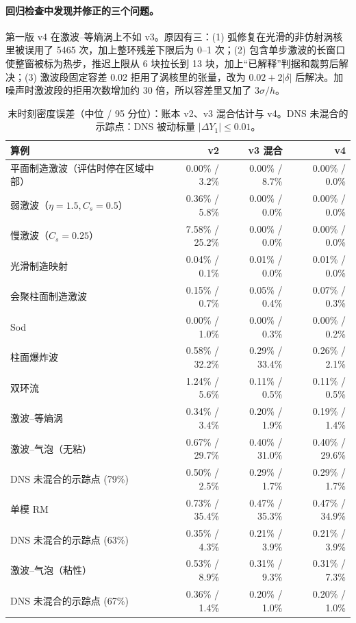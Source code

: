 \paragraph{回归检查中发现并修正的三个问题。}第一版 v4 在激波–等熵涡上不如 v3。原因有三：(1) 弧修复在光滑的非仿射涡核里被误用了 5465 次，加上整环残差下限后为 0–1 次；(2) 包含单步激波的长窗口使整窗被标为热步，推迟上限从 6 块拉长到 13 块，加上“已解释”判据和裁剪后解决；(3) 激波段固定容差 0.02 拒用了涡核里的张量，改为 $0.02+2|\delta|$ 后解决。加噪声时激波段的拒用次数增加约 30 倍，所以容差里又加了 $3\hat\sigma/h$。
\begin{table}[!htbp]\centering\small\caption{末时刻密度误差（中位 / 95 分位）：账本 v2、v3 混合估计与 v4。DNS 未混合的示踪点：DNS 被动标量 $|\Delta Y_1|\le0.01$。}
\begin{tabularx}{\linewidth}{@{}L r r r@{}}\toprule
算例 & v2 & v3 混合 & v4\\\midrule
平面制造激波（评估时停在区域中部） & 0.00\% / 3.2\% & 0.00\% / 8.7\% & 0.00\% / 0.0\%\\
弱激波（$\eta=1.5,C_s=0.5$） & 0.36\% / 5.8\% & 0.00\% / 0.0\% & 0.00\% / 0.0\%\\
慢激波（$C_s=0.25$） & 7.58\% / 25.2\% & 0.00\% / 0.0\% & 0.00\% / 0.0\%\\
光滑制造映射 & 0.04\% / 0.1\% & 0.01\% / 0.0\% & 0.01\% / 0.0\%\\
会聚柱面制造激波 & 0.15\% / 0.7\% & 0.05\% / 0.4\% & 0.07\% / 0.3\%\\
Sod & 0.00\% / 1.0\% & 0.00\% / 0.3\% & 0.00\% / 0.2\%\\
柱面爆炸波 & 0.58\% / 32.2\% & 0.29\% / 33.4\% & 0.26\% / 2.1\%\\
双环流 & 1.24\% / 5.6\% & 0.11\% / 0.5\% & 0.11\% / 0.5\%\\
激波–等熵涡 & 0.34\% / 3.4\% & 0.20\% / 1.9\% & 0.19\% / 1.4\%\\
激波–气泡（无粘） & 0.67\% / 29.7\% & 0.40\% / 31.0\% & 0.40\% / 29.6\%\\
\quad DNS 未混合的示踪点 (79\%) & 0.50\% / 2.5\% & 0.29\% / 1.7\% & 0.29\% / 1.7\%\\
单模 RM & 0.73\% / 35.4\% & 0.47\% / 35.3\% & 0.47\% / 34.9\%\\
\quad DNS 未混合的示踪点 (63\%) & 0.35\% / 4.3\% & 0.21\% / 3.9\% & 0.21\% / 3.9\%\\
激波–气泡（粘性） & 0.53\% / 8.9\% & 0.31\% / 9.3\% & 0.31\% / 7.3\%\\
\quad DNS 未混合的示踪点 (67\%) & 0.36\% / 1.4\% & 0.20\% / 1.0\% & 0.20\% / 1.0\%\\
\bottomrule\end{tabularx}\end{table}
